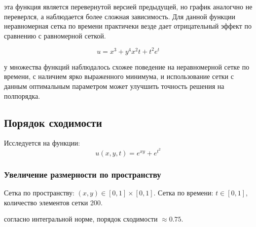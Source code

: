 \conclusion эта функция является перевернутой версией предыдущей, но график аналогчно не переверлся, а наблюдается более сложная зависимость. Для данной функции неравномерная сетка по времени практичеки везде дает отрицательный эффект по сравнению с равномерной сеткой.

$$ u = x^3 + y^4 x^2 t + t^2 e^t $$



\conclusion у множества функций наблюдалось схожее поведение на неравномерной сетке по времени, с наличием ярко выраженного минимума, и использование сетки с данным оптимальным параметром может улучшить точность решения на полпорядка.

\subsection{Порядок сходимости}

Исследуется на функции:
$$ u(x, y, t) = e^{xy} + e^{t^2} $$

\subsubsection{Увеличение размерности по пространству}

Сетка по пространству: $ (x, y) \in [0, 1] \times [0, 1] $. Сетка по времени: $ t \in [0, 1] $, количество элементов сетки 200.

\noindent{}

\conclusion согласно интегральной норме, порядок сходимости $\approx 0.75$.

\noindent{}

